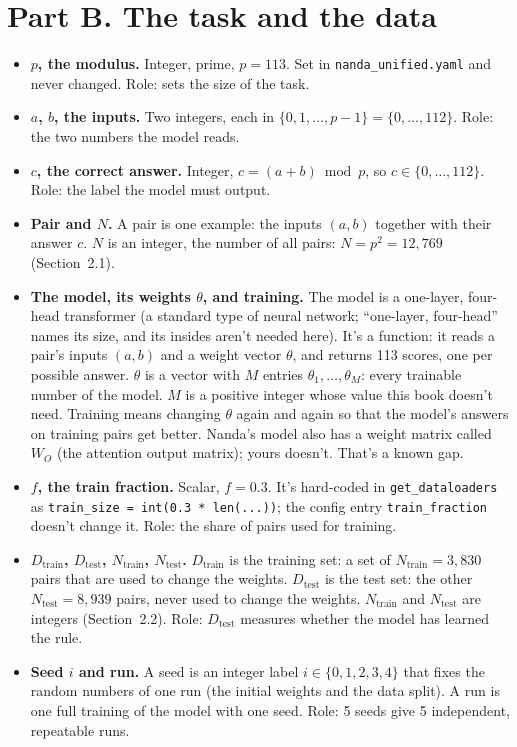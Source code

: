 \documentclass[11pt,a4paper,oneside,openany]{report}
\newcommand{\Ntrain}{N_{\mathrm{train}}}
\newcommand{\Ntest}{N_{\mathrm{test}}}
\newcommand{\Dtrain}{D_{\mathrm{train}}}
\newcommand{\Dtest}{D_{\mathrm{test}}}
\newcommand{\code}[1]{\texttt{#1}}
\newcommand{\gl}[1]{\textbf{#1}}   %
\newenvironment{glist}{\begin{itemize}\setlength{\itemsep}{2pt}\setlength{\parskip}{1pt}}{\end{itemize}}
\begin{document}
\section*{Part B. The task and the data}

\begin{glist}
\item[\gl{N1}] \textbf{$p$, the modulus.} Integer, prime, $p = 113$. Set in \code{nanda\_\allowbreak{}unified.yaml} and never changed. Role: sets the size of the task.
\item[\gl{N2}] \textbf{$a$, $b$, the inputs.} Two integers, each in $\{0, 1, \ldots, p-1\} = \{0, \ldots, 112\}$. Role: the two numbers the model reads.
\item[\gl{N3}] \textbf{$c$, the correct answer.} Integer, $c = (a+b) \bmod p$, so $c \in \{0, \ldots, 112\}$. Role: the label the model must output.
\item[\gl{N4}] \textbf{Pair and $N$.} A pair is one example: the inputs $(a, b)$ together with their answer $c$. $N$ is an integer, the number of all pairs: $N = p^2 = 12{,}769$ (Section~2.1).
\item[\gl{N5}] \textbf{The model, its weights $\theta$, and training.} The model is a one-layer, four-head transformer (a standard type of neural network; ``one-layer, four-head'' names its size, and its insides aren't needed here). It's a function: it reads a pair's inputs $(a, b)$ and a weight vector $\theta$, and returns 113 scores, one per possible answer. $\theta$ is a vector with $M$ entries $\theta_1, \ldots, \theta_M$: every trainable number of the model. $M$ is a positive integer whose value this book doesn't need. Training means changing $\theta$ again and again so that the model's answers on training pairs get better. Nanda's model also has a weight matrix called $W_O$ (the attention output matrix); yours doesn't. That's a known gap.
\item[\gl{N6}] \textbf{$f$, the train fraction.} Scalar, $f = 0.3$. It's hard-coded in \code{get\_\allowbreak{}dataloaders} as \code{train\_\allowbreak{}size = int(0.3 * len(...))}; the config entry \code{train\_\allowbreak{}fraction} doesn't change it. Role: the share of pairs used for training.
\item[\gl{N7}] \textbf{$\Dtrain$, $\Dtest$, $\Ntrain$, $\Ntest$.} $\Dtrain$ is the training set: a set of $\Ntrain = 3{,}830$ pairs that are used to change the weights. $\Dtest$ is the test set: the other $\Ntest = 8{,}939$ pairs, never used to change the weights. $\Ntrain$ and $\Ntest$ are integers (Section~2.2). Role: $\Dtest$ measures whether the model has learned the rule.
\item[\gl{N8}] \textbf{Seed $i$ and run.} A seed is an integer label $i \in \{0, 1, 2, 3, 4\}$ that fixes the random numbers of one run (the initial weights and the data split). A run is one full training of the model with one seed. Role: 5 seeds give 5 independent, repeatable runs.
\end{glist}
\end{document}
